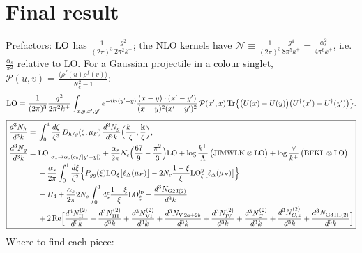 \documentclass[10pt]{article}
\numberwithin{equation}{section}
\newcommand{\LO}{{\rm LO}}
\newcommand{\PP}{\mathcal P}
\newcommand{\Tr}{{\rm Tr}}
\newcommand{\Ud}{U^\dagger}
\begin{document}
\section{Final result}\label{sec:final}
Prefactors: $\LO$ has $\frac{1}{(2\pi)^3}\frac{g^2}{2\pi^2k^+}$; the NLO kernels have $\mathcal N\equiv\frac{1}{(2\pi)^3}\frac{g^4}{8\pi^5k^+}=\frac{\alpha_s^2}{4\pi^6k^+}$, i.e.\ $\frac{\alpha_s}{\pi^2}$ relative to LO. For a Gaussian projectile in a colour singlet, $\PP(u,v)=\frac{\langle\rho^f(u)\rho^f(v)\rangle}{N_c^2-1}$:
\begin{equation}
\LO=\frac{1}{(2\pi)^3}\frac{g^2}{2\pi^2k^+}\int_{x,y,x',y'}e^{-ik\cdot(y'-y)}\frac{(x-y)\cdot(x'-y')}{(x-y)^2(x'-y')^2}\,\PP(x',x)\,\Tr\big\{\big(U(x)-U(y)\big)\big(\Ud(x')-\Ud(y')\big)\big\}.
\end{equation}
\begin{equation}
\boxed{\begin{aligned}
\frac{d^3N_h}{d^3k}={}&\int_0^1\frac{d\zeta}{\zeta^3}\,D_{h/g}(\zeta,\mu_F)\,\frac{d^3N_g}{d^3k}\Big(\frac{k^+}{\zeta},\frac{\mathbf k}{\zeta}\Big),\\
\frac{d^3N_g}{d^3k}={}&\LO\big|_{\alpha_s\to\alpha_s(c_0/|y'-y|)}+\frac{\alpha_s}{2\pi}N_c\Big(\frac{67}{9}-\frac{\pi^2}{3}\Big)\LO+\log\frac{k^+}{\Lambda}\,\big(\text{JIMWLK}\otimes\LO\big)+\log\frac{\vee}{k^+}\,\big(\text{BFKL}\otimes\LO\big)\\
&-\frac{\alpha_s}{2\pi}\int_0^1\frac{d\xi}{\xi^2}\Big\{P_{gg}(\xi)\LO_\xi\big[\ell_\Delta(\mu_F)\big]-2N_c\frac{1-\xi}{\xi}\LO^y_\xi\big[\ell_\Delta(\mu_F)\big]\Big\}\\
&-H_4+\frac{\alpha_s}{2\pi}2N_c\int_0^1d\xi\frac{1-\xi}{\xi}\LO^{\rm lp}_\xi+\frac{d^3N_{\rm G2\,I(2)}}{d^3k}\\
&+2\,{\rm Re}\Big[\frac{d^3N^{(2)}_{\rm II}}{d^3k}+\frac{d^3N^{(2)}_{\rm III}}{d^3k}+\frac{d^3N^{(2)}_{\rm V1}}{d^3k}+\frac{d^3N_{{\rm V}\,2a+2b}}{d^3k}+\frac{d^3N^{(2)}_{\rm IV}}{d^3k}+\frac{d^3N^{(2)}_{C}}{d^3k}+\frac{d^3N^{(2)}_{C,z}}{d^3k}+\frac{d^3N_{\rm G3\,III(2)}}{d^3k}\Big]
\end{aligned}}\label{eq:final}
\end{equation}
Where to find each piece:
\end{document}
